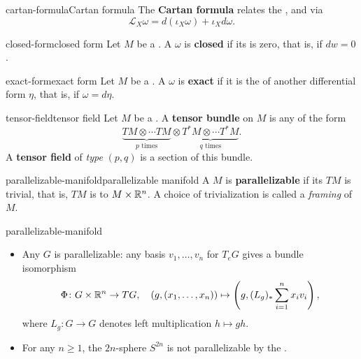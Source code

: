 \begin{topic}{cartan-formula}{Cartan formula}
    The \textbf{Cartan formula} relates the ,  and  via
    \[ \mathcal{L}_X \omega = d(\iota_X \omega) + \iota_X d \omega . \]
\end{topic}

\begin{topic}{closed-form}{closed form}
    Let $M$ be a . A  $\omega$ is \textbf{closed} if its  is zero, that is, if $dw = 0$.
\end{topic}

\begin{topic}{exact-form}{exact form}
    Let $M$ be a . A  $\omega$ is \textbf{exact} if it is the  of another differential form $\eta$, that is, if $\omega = d \eta$.
\end{topic}

\begin{topic}{tensor-field}{tensor field}
    Let $M$ be a . A \textbf{tensor bundle} on $M$ is any  of the form
    \[ \underbrace{TM \otimes \cdots TM}_{p \text{ times}} \otimes \underbrace{T^*M \otimes \cdots T^*M}_{q \text{ times}} . \]
    A \textbf{tensor field} of \textit{type} $(p, q)$ is a section of this bundle.
\end{topic}

\begin{topic}{parallelizable-manifold}{parallelizable manifold}
    A  $M$ is \textbf{parallelizable} if its  $TM$ is trivial, that is, $TM$ is  to $M \times \mathbb{R}^n$. A choice of trivialization is called a \textit{framing} of $M$.
\end{topic}

\begin{example}{parallelizable-manifold}
    \begin{itemize}
        \item Any  $G$ is parallelizable: any basis $v_1, \ldots, v_n$ for $T_e G$ gives a bundle isomorphism
        \[ \Phi \colon G \times \mathbb{R}^n \to TG, \quad (g, (x_1, \ldots, x_n)) \mapsto \left(g, (L_g)_* \sum_{i = 1}^{n} x_i v_i \right) , \]
        where $L_g \colon G \to G$ denotes left multiplication $h \mapsto gh$.
        \item For any $n \ge 1$, the $2n$-sphere $S^{2n}$ is not parallelizable by the .
    \end{itemize}
\end{example}

